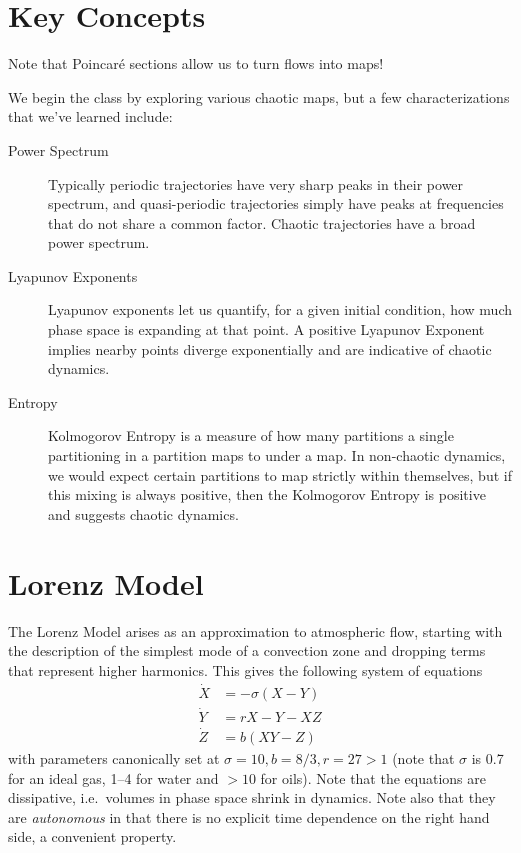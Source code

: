 \documentclass[12pt]{article}
\begin{document}
\onehalfspacing

\pagestyle{fancy}
\cfoot{\thepage/\pageref{LastPage}}

\tableofcontents
\clearpage

\section{Key Concepts}

Note that Poincar\'e sections allow us to turn flows into maps!

We begin the class by exploring various chaotic maps, but a few
characterizations that we've learned include:
\begin{description}
    \item[Power Spectrum] Typically periodic trajectories have very sharp peaks
        in their power spectrum, and quasi-periodic trajectories simply have
        peaks at frequencies that do not share a common factor. Chaotic
        trajectories have a broad power spectrum.

    \item[Lyapunov Exponents] Lyapunov exponents let us quantify, for a given
        initial condition, how much phase space is expanding at that point. A
        positive Lyapunov Exponent implies nearby points diverge exponentially
        and are indicative of chaotic dynamics.

    \item[Entropy] Kolmogorov Entropy is a measure of how many partitions a
        single partitioning in a partition maps to under a map. In non-chaotic
        dynamics, we would expect certain partitions to map strictly within
        themselves, but if this mixing is always positive, then the Kolmogorov
        Entropy is positive and suggests chaotic dynamics.
\end{description}

\section{Lorenz Model}

The Lorenz Model arises as an approximation to atmospheric flow, starting with
the description of the simplest mode of a convection zone and dropping terms
that represent higher harmonics. This gives the following system of equations
\begin{align}
    \dot{X} &= -\sigma(X - Y) \nonumber\\
    \dot{Y} &= rX - Y - XZ \nonumber\\
    \dot{Z} &= b(XY - Z)
\end{align}
with parameters canonically set at $\sigma = 10, b = 8/3, r =27 > 1$ (note that
$\sigma$ is 0.7 for an ideal gas, 1--4 for water and $>10$ for oils). Note that
the equations are dissipative, i.e.\ volumes in phase space shrink in dynamics.
Note also that they are \emph{autonomous} in that there is no explicit time
dependence on the right hand side, a convenient property.
\end{document}
